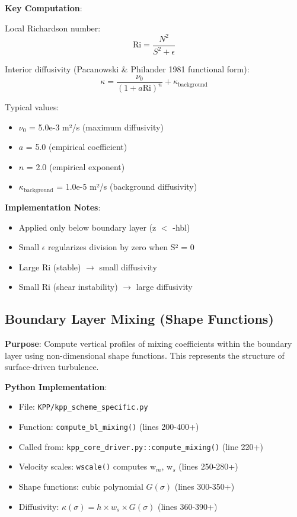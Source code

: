 \documentclass[11pt]{article}
\begin{document}
\textbf{Key Computation}:

Local Richardson number:
\begin{equation}
\text{Ri} = \frac{N^2}{S^2 + \epsilon}
\end{equation}

Interior diffusivity (Pacanowski \& Philander 1981 functional form):
\begin{equation}
\kappa = \frac{\nu_0}{(1 + a \text{Ri})^n} + \kappa_{\text{background}}
\end{equation}

Typical values:
\begin{itemize}
    \item $\nu_0$ = 5.0e-3 m²/s (maximum diffusivity)
    \item $a$ = 5.0 (empirical coefficient)
    \item $n$ = 2.0 (empirical exponent)
    \item $\kappa_{\text{background}}$ = 1.0e-5 m²/s (background diffusivity)
\end{itemize}

\textbf{Implementation Notes}:
\begin{itemize}
    \item Applied only below boundary layer (z $<$ -hbl)
    \item Small $\epsilon$ regularizes division by zero when S² = 0
    \item Large Ri (stable) $\rightarrow$ small diffusivity
    \item Small Ri (shear instability) $\rightarrow$ large diffusivity
\end{itemize}

\subsection{Boundary Layer Mixing (Shape Functions)}

\textbf{Purpose}: Compute vertical profiles of mixing coefficients within the boundary layer using non-dimensional shape functions. This represents the structure of surface-driven turbulence.

\textbf{Python Implementation}:
\begin{itemize}
    \item File: \verb|KPP/kpp_scheme_specific.py|
    \item Function: \verb|compute_bl_mixing()| (lines 200-400+)
    \item Called from: \verb|kpp_core_driver.py::compute_mixing()| (line 220+)
    \item Velocity scales: \verb|wscale()| computes w$_m$, w$_s$ (lines 250-280+)
    \item Shape functions: cubic polynomial $G(\sigma)$ (lines 300-350+)
    \item Diffusivity: $\kappa(\sigma) = h \times w_s \times G(\sigma)$ (lines 360-390+)
\end{itemize}
\end{document}
